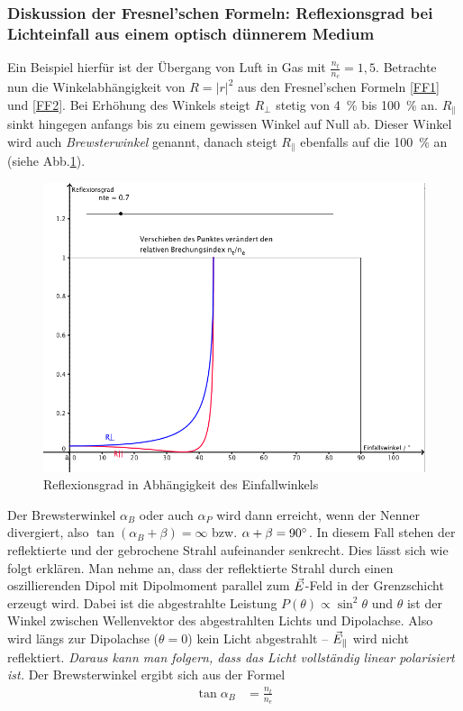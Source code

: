 \subsubsection{Diskussion der Fresnel'schen Formeln: Reflexionsgrad
  bei Lichteinfall aus einem optisch dünnerem Medium}
Ein Beispiel hierfür ist der Übergang von Luft in Gas mit $\frac{n_t}{n_e}=1,5$.
Betrachte nun die Winkelabhängigkeit von $R=\vert r\vert^2$ aus den
Fresnel'schen Formeln \ref{FF1} und \ref{FF2}. 
Bei Erhöhung des Winkels steigt $R_{\bot}$ stetig von \SI{4}{\percent}
bis \SI{100}{\percent} an. 
$R_{\parallel}$ sinkt hingegen anfangs bis zu einem gewissen Winkel
auf Null ab. Dieser Winkel wird auch
\emph{Brewsterwinkel}%
%
genannt, danach steigt
$R_{\parallel}$ ebenfalls auf die \SI{100}{\percent} an (siehe
Abb.\ref{RefGrad}).
\begin{figure}
  \includegraphics[width=\linewidth]{Bilder/Reflexionsgrad}
  \caption{Reflexionsgrad in Abhängigkeit des Einfallwinkels\label{RefGrad}}
\end{figure}
Der Brewsterwinkel $\alpha_B$ oder auch $\alpha_P$ wird dann erreicht,
wenn der Nenner divergiert, also $\tan(\alpha_B+\beta)=\infty$
bzw. $\alpha+\beta=90\degree$. In diesem Fall stehen der reflektierte
und der gebrochene Strahl aufeinander senkrecht.
Dies lässt sich wie folgt erklären. Man nehme an, dass der
reflektierte Strahl durch einen oszillierenden Dipol mit Dipolmoment
parallel zum $\vec{E}$-Feld in der Grenzschicht erzeugt wird. Dabei ist
die abgestrahlte Leistung $P(\theta)\propto\sin^2\theta$ und $\theta$
ist der Winkel zwischen Wellenvektor des abgestrahlten Lichts und
Dipolachse. Also wird längs zur Dipolachse ($\theta=0$) kein Licht
abgestrahlt -- $\vec{E}_{\parallel}$ wird nicht reflektiert. 
\emph{Daraus kann man folgern, dass das Licht vollständig linear
  polarisiert ist.}
Der Brewsterwinkel ergibt sich aus der Formel
\begin{align*}
  \tan\alpha_B &= \frac{n_t}{n_e}
\end{align*}


